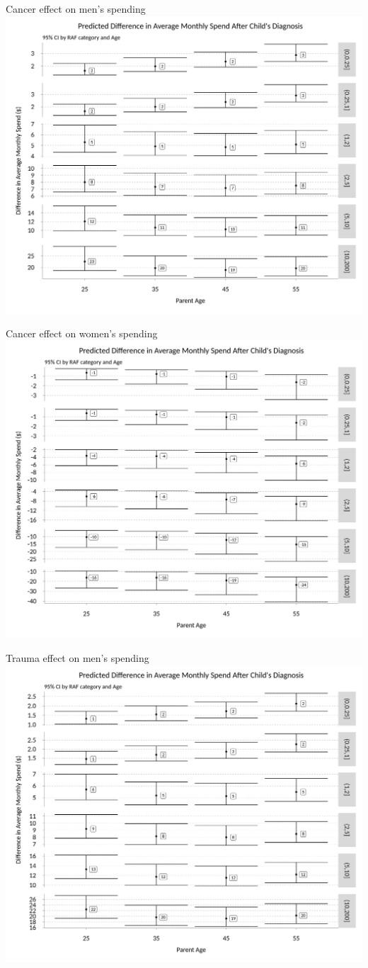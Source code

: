 \documentclass[xcolor=x11names,compress]{beamer}
\renewcommand{\(}{\begin{columns}}
\renewcommand{\)}{\end{columns}}
\newcommand{\<}[1]{\begin{column}{#1}}
\renewcommand{\>}{\end{column}}
\begin{document}
\begin{frame}{Cancer effect on men's spending}
\includegraphics[width=.75\linewidth]{../figures/predicted_spend_male_CA.png}
\end{frame}

\begin{frame}{Cancer effect on women's spending}
\includegraphics[width=.75\linewidth]{../figures/predicted_spend_female_CA.png}
\end{frame}

\begin{frame}{Trauma effect on men's spending}
\includegraphics[width=.75\linewidth]{../figures/predicted_spend_male_Trauma.png}
\end{frame}
\end{document}
